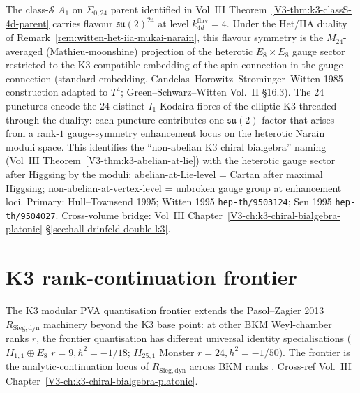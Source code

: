 \begin{remark}
\label{rem:witten-e8-e8-flavour-structure}
%
The class-$\mathcal{S}$ $A_{1}$ on $\Sigma_{0,24}$ parent identified in
Vol~III Theorem~\ref*{V3-thm:k3-classS-4d-parent} carries flavour
$\mathfrak{su}(2)^{24}$ at level $k_{4d}^{\mathrm{flav}} = 4$. Under the
Het/IIA duality of Remark~\ref{rem:witten-het-iia-mukai-narain}, this
flavour symmetry is the $M_{24}$-averaged (Mathieu-moonshine) projection
of the heterotic $E_{8} \times E_{8}$ gauge sector restricted to the
K3-compatible embedding of the spin connection in the gauge connection
(standard embedding, Candelas--Horowitz--Strominger--Witten 1985
construction adapted to $T^{4}$; Green--Schwarz--Witten Vol.~II \S16.3).
The $24$ punctures encode the $24$ distinct $I_{1}$ Kodaira fibres of the
elliptic K3 threaded through the duality: each puncture contributes one
$\mathfrak{su}(2)$ factor that arises from a rank-$1$ gauge-symmetry
enhancement locus on the heterotic Narain moduli space. This identifies
the ``non-abelian K3 chiral bialgebra'' naming (Vol~III
Theorem~\ref*{V3-thm:k3-abelian-at-lie}) with the heterotic gauge sector
after Higgsing by the moduli: abelian-at-Lie-level = Cartan after
maximal Higgsing; non-abelian-at-vertex-level = unbroken gauge group at
enhancement loci. Primary: Hull--Townsend 1995; Witten 1995
\texttt{hep-th/9503124}; Sen 1995 \texttt{hep-th/9504027}. Cross-volume
bridge: Vol~III Chapter~\ref*{V3-ch:k3-chiral-bialgebra-platonic}
\S\ref*{sec:hall-drinfeld-double-k3}.
\end{remark}

\section{K3 rank-continuation frontier}
\label{sec:mpvaqf-supplement}

\begin{remark}
\label{rem:mpvaqf-1}
The K3 modular PVA quantisation frontier extends the Pasol--Zagier
2013 $R_{\mathrm{Sieg,dyn}}$ machinery beyond the K3 base point: at
other BKM Weyl-chamber ranks $r$, the frontier quantisation has
different universal identity specialisations ($II_{1,1}\oplus E_8$
$r=9, \hbar^2=-1/18$; $II_{25,1}$ Monster $r=24, \hbar^2=-1/50$). The
frontier is the analytic-continuation locus of $R_{\mathrm{Sieg,dyn}}$
across BKM ranks \cite{PasolZagier2013,Borcherds1998}. Cross-ref
Vol.~III Chapter~\ref{V3-ch:k3-chiral-bialgebra-platonic}.
\end{remark}
